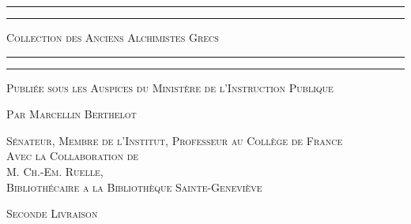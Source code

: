 \documentclass[a4paper, 11pt, oneside, polutonikogreek, french]{article}
\begin{document}
\renewcommand{\thefootnote}{{\tiny\arabic{footnote}}}
\begin{titlepage} %
	\centering %

	
	\rule{\textwidth}{1.6pt}\vspace*{-\baselineskip}\vspace*{2pt} %
	\rule{\textwidth}{0.4pt} %
	
	\vspace{1\baselineskip} %
	
	{\scshape\Huge Collection des Anciens Alchimistes Grecs}
	
	\vspace{1\baselineskip} %

	\rule{\textwidth}{0.4pt}\vspace*{-\baselineskip}\vspace{3.2pt} %
	\rule{\textwidth}{1.6pt} %
	
	\vspace{1\baselineskip} %
	
	
	{\scshape \normalsize Publiée sous les Auspices du Ministère de l'Instruction Publique}
	
	{\scshape Par \Large Marcellin Berthelot} %
	
	\vspace*{1\baselineskip} %
	
        {\scshape\scriptsize Sénateur, Membre de l'Institut, Professeur au Collège de France \\Avec la Collaboration de \\\large M. Ch.-Em. Ruelle,\\\scriptsize Bibliothécaire a la Bibliothèque Sainte-Geneviève} %
  
        \vspace{4\baselineskip}
  
	{\scshape \normalsize Seconde Livraison} %
  


\end{titlepage}
\end{document}
